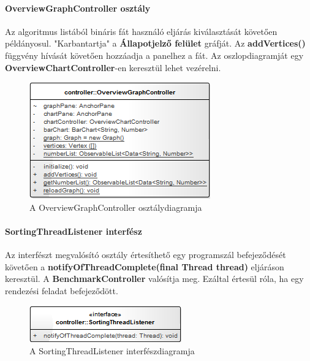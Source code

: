 \documentclass{elteikthesis}
\begin{document}
\paragraph{OverviewGraphController osztály}
Az algoritmus listából bináris fát használó eljárás kiválasztását követően példányosul. "Karbantartja" a \textbf{Állapotjelző felület} gráfját. Az \textbf{addVertices()} függvény hívását követően hozzáadja a panelhez a fát. Az oszlopdiagramját egy \textbf{OverviewChartController}-en keresztül lehet vezérelni.
\begin{figure}[H]
	\centering
	\includegraphics{pics/class/OverviewGraphController.png}
	\caption{A OverviewGraphController osztálydiagramja}
\end{figure}
\paragraph{SortingThreadListener interfész}
Az interfészt megvalósító osztály értesíthető egy programszál befejeződését követően a \textbf{notifyOfThreadComplete(final Thread thread)} eljáráson keresztül. A \textbf{BenchmarkController} valósítja meg. Ezáltal értesül róla, ha egy rendezési feladat befejeződött.
\begin{figure}[H]
	\centering
	\includegraphics{pics/class/SortingThreadListener.png}
	\caption{A SortingThreadListener interfészdiagramja}
\end{figure}
\end{document}
